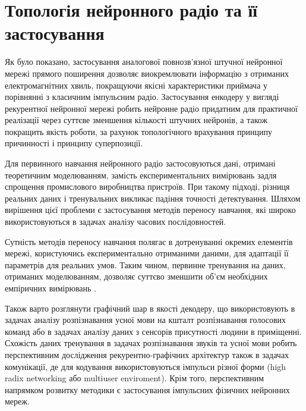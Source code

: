 
\section{Топологія нейронного радіо та її застосування}

Як було показано, застосування аналогової повнозв'язної штучної нейронної 
мережі прямого поширення дозволяє виокремлювати інформацію з отриманих 
електромагнітних хвиль, покращуючи якісні характеристики приймача у 
порівнянні з класичним імпульсним радіо. Застосування енкодеру у вигляді 
рекурентної нейронної мережі робить нейронне радіо придатним для практичної 
реалізації через суттєве зменшення кількості штучних нейронів, а також 
покращить якість роботи, за рахунок топологічного врахування принципу 
причинності і принципу суперпозиції.

Для первинного навчання нейронного радіо застосовуються дані, отримані 
теоретичним моделюванням, замість експериментальних вимірювань задля спрощення 
промислового виробництва пристроїв. При такому підході,
різниця реальних даних і тренувальних викликає падіння точності детектування.
Шляхом вирішення цієї проблеми є застосування методів переносу навчання, які 
широко використовуються в задачах аналізу часових послідовностей. 

Сутність методів переносу навчання полягає в дотренуванні окремих елементів 
мережі, користуючись експериментально отриманими даними, для адаптації її 
параметрів для реальних умов. Таким чином, первинне тренування на даних,
отриманих моделюванням, дозволяє суттєво зменшити об'єм необхідних 
емпіричних вимірювань \cite{imp:Bozinovski2020}.

Також варто розглянути графічний шар в якості декодеру, що використовують в
задачах аналізу розпізнавання усної мови на кшталт розпізнавання голосових 
команд або в задачах аналізу даних з сенсорів
присутності людини в приміщенні. Схожість даних
тренування в задачах розпізнавання звуків та усної мови робить перспективним
дослідження рекурентно-графічних архітектур також в задачах комунікації, де 
для кодування використовуються імпульси різної форми (high radix networking
або multiuser enviroment).
Крім того, перспективним напрямком розвитку методики є застосування 
імпульсних фізичних нейронних мереж.

